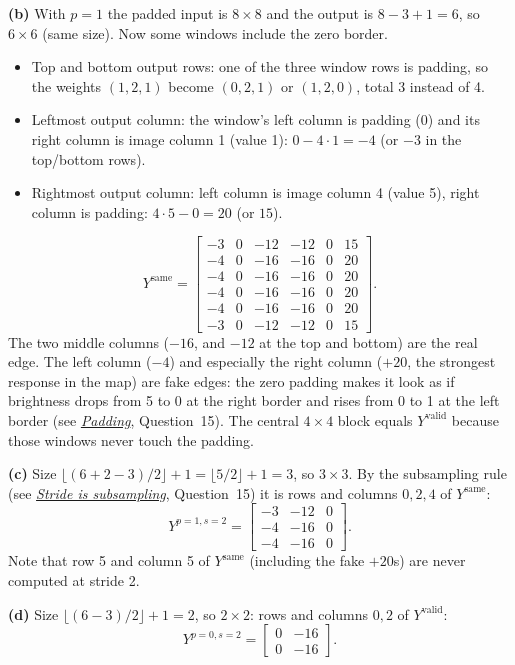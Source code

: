 \documentclass[12pt,a4paper]{article}
\newcommand{\seeconcept}[3]{(see \hyperref[#1]{\textit{#2}}, Question~#3)}
\begin{document}
\textbf{(b)} With $p=1$ the padded input is $8\times8$ and the output is $8-3+1=6$, so $6\times6$ (same size). Now some windows include the zero border.
\begin{itemize}[nosep]
\item Top and bottom output rows: one of the three window rows is padding, so the weights $(1,2,1)$ become $(0,2,1)$ or $(1,2,0)$, total 3 instead of 4.
\item Leftmost output column: the window's left column is padding (0) and its right column is image column 1 (value 1): $0-4\cdot1=-4$ (or $-3$ in the top/bottom rows).
\item Rightmost output column: left column is image column 4 (value 5), right column is padding: $4\cdot5-0=20$ (or $15$).
\end{itemize}
\[
Y^{\text{same}}=\begin{bmatrix}
-3&0&-12&-12&0&15\\
-4&0&-16&-16&0&20\\
-4&0&-16&-16&0&20\\
-4&0&-16&-16&0&20\\
-4&0&-16&-16&0&20\\
-3&0&-12&-12&0&15
\end{bmatrix}.
\]
The two middle columns ($-16$, and $-12$ at the top and bottom) are the real edge. The left column ($-4$) and especially the right column ($+20$, the strongest response in the map) are fake edges: the zero padding makes it look as if brightness drops from 5 to 0 at the right border and rises from 0 to 1 at the left border \seeconcept{c:padding}{Padding}{15}. The central $4\times4$ block equals $Y^{\text{valid}}$ because those windows never touch the padding.

\textbf{(c)} Size $\lfloor(6+2-3)/2\rfloor+1=\lfloor5/2\rfloor+1=3$, so $3\times3$. By the subsampling rule \seeconcept{c:stride}{Stride is subsampling}{15} it is rows and columns $0,2,4$ of $Y^{\text{same}}$:
\[
Y^{p=1,s=2}=\begin{bmatrix}-3&-12&0\\-4&-16&0\\-4&-16&0\end{bmatrix}.
\]
Note that row 5 and column 5 of $Y^{\text{same}}$ (including the fake $+20$s) are never computed at stride 2.

\textbf{(d)} Size $\lfloor(6-3)/2\rfloor+1=2$, so $2\times2$: rows and columns $0,2$ of $Y^{\text{valid}}$:
\[
Y^{p=0,s=2}=\begin{bmatrix}0&-16\\0&-16\end{bmatrix}.
\]
\end{document}
